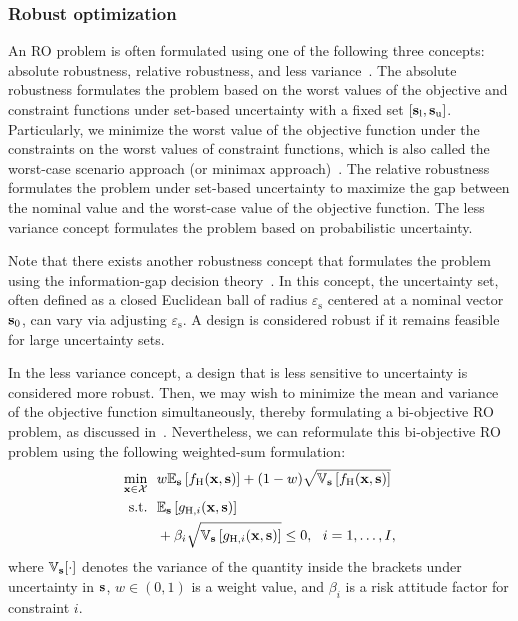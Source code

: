 \documentclass[iicol,sn-basic]{sn-jnl}%
\begin{document}
\subsubsection{Robust optimization}\label{Sec631}

An RO problem is often formulated using one of the following three concepts: absolute robustness, relative robustness, and less variance~\citep{Kanno2020}.
The absolute robustness formulates the problem based on the worst values of the objective and constraint functions under set-based uncertainty with a fixed set $[{\bf s}_\text{l},{\bf s}_\text{u}]$.
Particularly, we minimize the worst value of the objective function under the constraints on the worst values of constraint functions, which is also called the worst-case scenario approach (or minimax approach)~\citep[see e.g.,][]{BenTal2009,Elishakoff2010}.
The relative robustness formulates the problem under set-based uncertainty to maximize the gap between the nominal value and the worst-case value of the objective function.
The less variance concept formulates the problem based on probabilistic uncertainty.

Note that there exists another robustness concept that formulates the problem using the information-gap decision theory~\citep{Hemez2004}.
In this concept, the uncertainty set, often defined as a closed Euclidean ball of radius $\varepsilon_\text{s}$ centered at a nominal vector ${\bf s}_0$, can vary via adjusting $\varepsilon_\text{s}$.  
A design is considered robust if it remains feasible for large uncertainty sets.

In the less variance concept, a design that is less sensitive to uncertainty is considered more robust.
Then, we may wish to minimize the mean and variance of the objective function simultaneously, thereby formulating a
bi-objective RO problem, as discussed in~.
Nevertheless, we can reformulate this bi-objective RO problem using the following weighted-sum formulation:
\begin{equation}\label{Eq69}
	\begin{aligned}
		\underset{{\bf x} \in \mathcal{X}}{\min} \ \ & w \mathbb{E}_{\bf s}\left[f_\text{H}({\bf x},{\bf s})\right]+(1-w)\sqrt{\mathbb{V}_{\bf s}\left[f_\text{H}({\bf x},{\bf s})\right]}\\
		\textrm{s.t.} \ \ 
		& \mathbb{E}_{\bf s}\left[g_{\text{H},i}({\bf x},{\bf s})\right] \\
		& + \beta_i \sqrt{\mathbb{V}_{\bf s}\left[g_{\text{H},i}({\bf x},{\bf s})\right]} \leq 0, \ \ i=1,\dots,I, 
	\end{aligned}
\end{equation}
where $\mathbb{V}_{\bf s}[\cdot]$ denotes the variance of the quantity inside the brackets under uncertainty in ${\bf s}$, $w \in (0,1)$ is a weight value, and $\beta_i$ is a risk attitude factor for constraint $i$.
\end{document}
